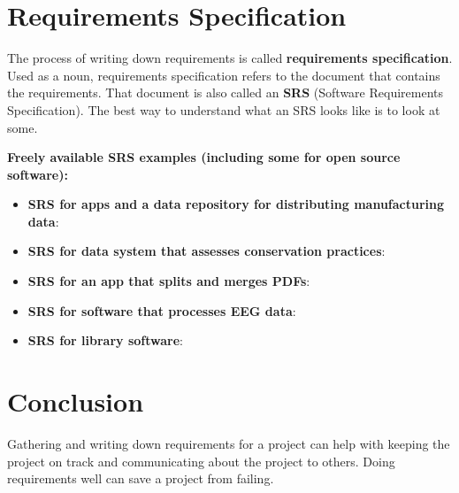 \section{Requirements Specification}

\marginpar{\requirementsSpecificationDef\margindivider}\marginpar{\srsDef\margindivider}
The process of writing down requirements is called \textbf{requirements specification}. Used as a noun, requirements specification refers to the document that contains the requirements. That document is also called an \textbf{SRS} (Software Requirements Specification). The best way to understand what an SRS looks like is to look at some.

\spacer
\noindent\textbf{Freely available SRS examples (including some for open source software):}
\spacer

\begin{itemize}
    \item \textbf{SRS for apps and a data repository for distributing manufacturing data}: \\
    \item \textbf{SRS for data system that assesses conservation practices}: \\
    \item \textbf{SRS for an app that splits and merges PDFs}: \\
    \item \textbf{SRS for software that processes EEG data}: \\
    \item \textbf{SRS for library software}: 
\end{itemize}

\nomargins

\section{Conclusion}
Gathering and writing down requirements for a project can help with keeping the project on track and communicating about the project to others. Doing requirements well can save a project from failing.

